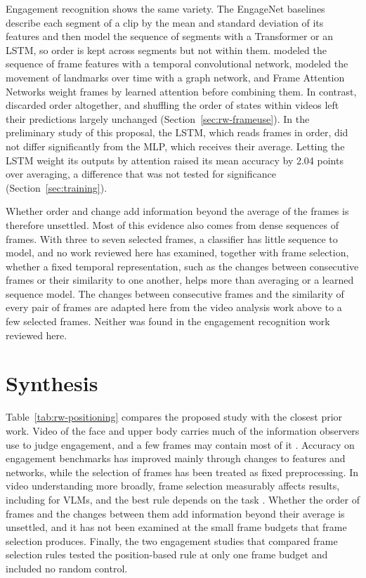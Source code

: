 Engagement recognition shows the same variety. The EngageNet baselines \cite{singh2023} describe each segment of a clip by the mean and standard deviation of its features and then model the sequence of segments with a Transformer or an LSTM, so order is kept across segments but not within them.  modeled the sequence of frame features with a temporal convolutional network,  modeled the movement of landmarks over time with a graph network, and Frame Attention Networks \cite{meng2019} weight frames by learned attention before combining them. In contrast,  discarded order altogether, and shuffling the order of states within videos left their predictions largely unchanged (Section~\ref{sec:rw-frameuse}). In the preliminary study of this proposal, the LSTM, which reads frames in order, did not differ significantly from the MLP, which receives their average. Letting the LSTM weight its outputs by attention raised its mean accuracy by 2.04 points over averaging, a difference that was not tested for significance (Section~\ref{sec:training}).

Whether order and change add information beyond the average of the frames is therefore unsettled. Most of this evidence also comes from dense sequences of frames. With three to seven selected frames, a classifier has little sequence to model, and no work reviewed here has examined, together with frame selection, whether a fixed temporal representation, such as the changes between consecutive frames or their similarity to one another, helps more than averaging or a learned sequence model. The changes between consecutive frames and the similarity of every pair of frames are adapted here from the video analysis work above to a few selected frames. Neither was found in the engagement recognition work reviewed here.



\section{Synthesis}
\label{sec:rw-synthesis}

Table~\ref{tab:rw-positioning} compares the proposed study with the closest prior work. Video of the face and upper body carries much of the information observers use to judge engagement, and a few frames may contain most of it \cite{whitehill2014}. Accuracy on engagement benchmarks has improved mainly through changes to features and networks, while the selection of frames has been treated as fixed preprocessing. In video understanding more broadly, frame selection measurably affects results, including for VLMs, and the best rule depends on the task \cite{brkic2025,tang2025aks}. Whether the order of frames and the changes between them add information beyond their average is unsettled, and it has not been examined at the small frame budgets that frame selection produces. Finally, the two engagement studies that compared frame selection rules tested the position-based rule at only one frame budget and included no random control.

